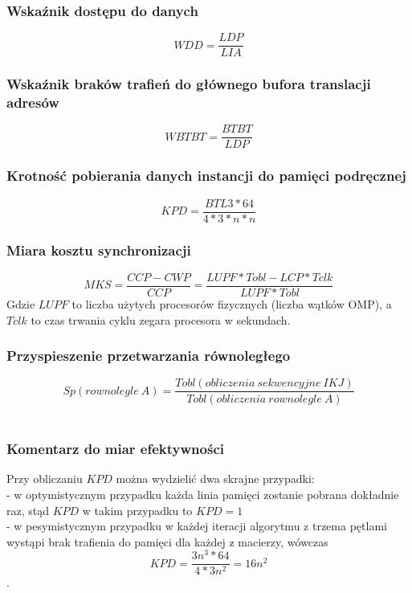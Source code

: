 \documentclass[10pt,a4paper]{article}
\begin{document}
\subsubsection*{Wskaźnik dostępu do danych}
\begin{equation}
    WDD = \frac{LDP}{LIA}
\end{equation}
\subsubsection*{Wskaźnik braków trafień do głównego bufora translacji adresów}
\begin{equation}
    WBTBT = \frac{BTBT}{LDP}
\end{equation}
\subsubsection*{Krotność pobierania danych instancji do pamięci podręcznej}
\begin{equation}
    KPD = \frac{BTL3 * 64}{4 * 3 * n * n}
\end{equation}
\subsubsection*{Miara kosztu synchronizacji}
\begin{equation}
    MKS = \frac{CCP - CWP}{CCP} = \frac{LUPF * Tobl - LCP * Tclk}{LUPF * Tobl}
\end{equation}
Gdzie $LUPF$ to liczba użytych procesorów fizycznych (liczba wątków OMP), a $Tclk$ 
to czas trwania cyklu zegara procesora w sekundach.
\subsubsection*{Przyspieszenie przetwarzania równoległego}
\begin{equation}
    Sp(rownolegle\: A) = \frac{Tobl(obliczenia \: sekwencyjne \: IKJ)}{Tobl(obliczenia \: rownolegle \: A)}
\end{equation}
\\
\subsubsection*{Komentarz do miar efektywności}
Przy obliczaniu $KPD$ można wydzielić dwa skrajne przypadki: \\
- w optymistycznym przypadku każda linia pamięci zostanie pobrana dokładnie raz,
stąd $KPD$ w takim przypadku to $KPD = 1$\\
- w pesymistycznym przypadku w każdej iteracji algorytmu z trzema pętlami wystąpi
brak trafienia do pamięci dla każdej z macierzy, wówczas $$KPD = \frac{3n^3 * 64}{4 * 3n^2}
= 16 n^2$$.
\end{document}
